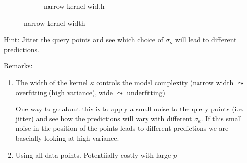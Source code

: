 \begin{frame}
\begin{figure}[ht]
\begin{subfigure}[t]{0.37\textwidth}
{         }
         \caption{narrow kernel width}
         \label{fig:linear}
     \end{subfigure}
\end{figure}


\pause

Hint: Jitter the query points and see which choice of $\sigma_{\kappa}$ will lead to different predictions.

\end{frame}

\begin{frame}

Remarks:
\begin{enumerate}
\item The width of the kernel $\kappa$ controls the model complexity (narrow width $\leadsto$ overfitting (high variance), wide $\leadsto$ underfitting)
 
One way to go about this is to apply a small noise to the query points (i.e. jitter) and see how the predictions will vary with different $\sigma_{\kappa}$. If this small noise in the position of the points leads to different predictions we are bascially looking at high variance.

\item Using all data points. Potentiially costly with large $p$
\end{enumerate}
\end{frame}
